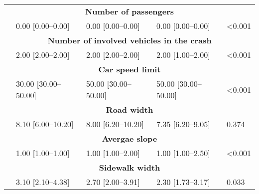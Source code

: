 \begin{longtable}{p{4.5cm}p{3cm}p{3cm}p{3cm}p{1.5cm}}
\hline
\multicolumn{5}{c}{\textbf{Number of passengers}} \\
 & 0.00 [0.00–0.00] & 0.00 [0.00–0.00] & 0.00 [0.00–0.00] & <0.001  \\
\hline
\multicolumn{5}{c}{\textbf{Number of involved vehicles in the crash}} \\
 & 2.00 [2.00–2.00] & 2.00 [2.00–2.00] & 2.00 [1.00–2.00] & <0.001  \\
\hline
\multicolumn{5}{c}{\textbf{Car speed limit}} \\
 & 30.00 [30.00–50.00] & 50.00 [30.00–50.00] & 50.00 [30.00–50.00] & <0.001  \\
\hline
\multicolumn{5}{c}{\textbf{Road width}} \\
 & 8.10 [6.00–10.20] & 8.00 [6.20–10.20] & 7.35 [6.20–9.05] & 0.374  \\
\hline
\multicolumn{5}{c}{\textbf{Avergae slope}} \\
 & 1.00 [1.00–1.00] & 1.00 [1.00–2.00] & 1.00 [1.00–2.50] & <0.001  \\
\hline
\multicolumn{5}{c}{\textbf{Sidewalk width}} \\
 & 3.10 [2.10–4.38] & 2.70 [2.00–3.91] & 2.30 [1.73–3.17] & 0.033  \\
\end{longtable}